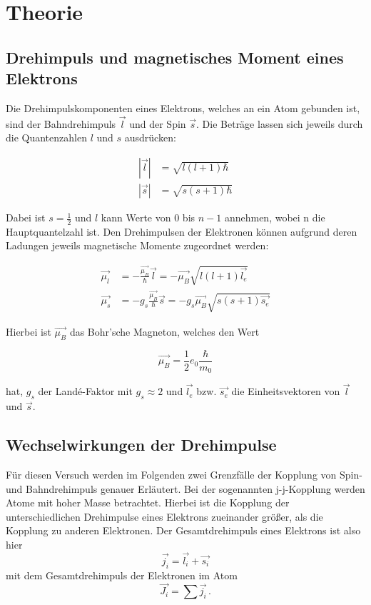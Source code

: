 \section{Theorie}
\label{sec:Theorie}

\subsection{Drehimpuls und magnetisches Moment eines Elektrons}

Die Drehimpulskomponenten eines Elektrons, welches an ein Atom gebunden ist, sind der Bahndrehimpuls $\vec{l}$ und der Spin $\vec{s}$.
Die Beträge lassen sich jeweils durch die Quantenzahlen $l$ und $s$ ausdrücken:


\begin{align}
    |\vec{l}| &= \sqrt{l(l+1)\hbar} \\
    |\vec{s}| &= \sqrt{s(s+1)\hbar} 
\end{align}

Dabei ist $s= \frac{1}2$ und $l$ kann Werte von $0$ bis $n-1$ annehmen, wobei n die Hauptquantelzahl ist. 
Den Drehimpulsen der Elektronen können aufgrund deren Ladungen jeweils magnetische Momente zugeordnet werden:

\begin{align}
    \vec{\mu_l} &= -\frac{\vec{\mu_B}}{\hbar}\vec{l} = -\vec{\mu_B}\sqrt{l(l+1)\vec{l_e}} \\
    \vec{\mu_s} &= -g_s\frac{\vec{\mu_B}}{\hbar}\vec{s} = -g_s\vec{\mu_B}\sqrt{s(s+1)\vec{s_e}} 
\end{align}

Hierbei ist $\vec{\mu_B}$ das Bohr'sche Magneton, welches den Wert 

\begin{equation}
    \vec{\mu_B} = \frac{1}2 e_0 \frac{\hbar}{m_0}
\end{equation}

hat, $g_s$ der Landé-Faktor mit $g_s\approx 2$ und $\vec{l_e}$ bzw. $\vec{s_e}$ die Einheitsvektoren von $\vec{l}$ und $\vec{s}$. 

\subsection{Wechselwirkungen der Drehimpulse}

Für diesen Versuch werden im Folgenden zwei Grenzfälle der Kopplung von Spin- und Bahndrehimpuls genauer Erläutert.
Bei der sogenannten j-j-Kopplung werden Atome mit hoher Masse betrachtet. Hierbei ist die Kopplung der unterschiedlichen Drehimpulse eines 
Elektrons zueinander größer, als die Kopplung zu anderen Elektronen. Der Gesamtdrehimpuls eines Elektrons ist also hier 
\begin{equation}
    \vec{j_i} = \vec{l_i} + \vec{s_i}
\end{equation} mit dem Gesamtdrehimpuls der Elektronen im Atom 
\begin{equation}
    \vec{J_i} = \sum \vec{j_i}\,.
\end{equation}

